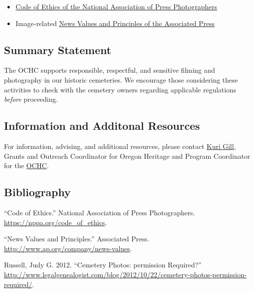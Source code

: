\documentclass[]{article}
\begin{document}
\begin{itemize}
\item
  \href{https://nppa.org/code_of_ethics}{Code of Ethics of the National
  Association of Press Photographers}
\item
  Image-related \href{https://diigo.com/05ns77}{News Values and
  Principles of the Associated Press}
\end{itemize}

\subsection{Summary Statement}\label{summary-statement}

The OCHC supports responsible, respectful, and sensitive filming and
photography in our historic cemeteries. We encourage those considering
these activities to check with the cemetery owners regarding applicable
regulations \emph{before} proceeding.

\subsection{Information and Additonal
Resources}\label{information-and-additonal-resources}

For information, advising, and additional resources, please contact
\href{mailto:Kuri.Gill@oregon.gov}{Kuri Gill}, Grants and Outreach
Coordinator for Oregon Heritage and Program Coordinator for the
\href{http://www.oregon.gov/oprd/HCD/OCHC/Pages/index.aspx}{OCHC}.

\subsection{Bibliography}\label{bibliography}

``Code of Ethics.'' National Association of Press Photographers.
\url{https://nppa.org/code_of_ethics}.

``News Values and Principles.'' Associated Press.
\url{http://www.ap.org/company/news-values}.

Russell, Judy G. 2012. ``Cemetery Photos: permission Required?''
\url{http://www.legalgenealogist.com/blog/2012/10/22/cemetery-photos-permission-required/}.
\end{document}
